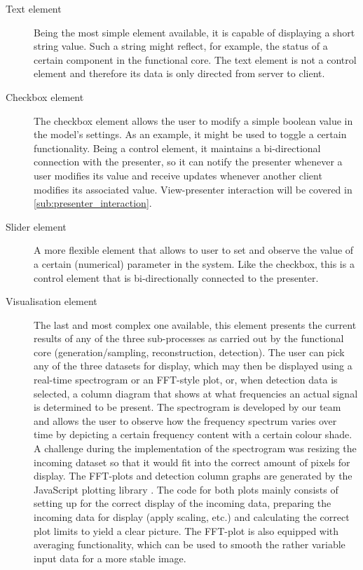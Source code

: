 \documentclass[a4paper, openany, oneside]{memoir}
\begin{document}
\begin{description}
	\item[Text element]
	Being the most simple element available, it is capable of displaying a short string value. Such a string might reflect, for example, the status of a certain component in the functional core. The text element is not a control element and therefore its data is only directed from server to client.

	\item[Checkbox element]
	The checkbox element allows the user to modify a simple boolean value in the model's settings. As an example, it might be used to toggle a certain functionality. Being a control element, it maintains a bi-directional connection with the presenter, so it can notify the presenter whenever a user modifies its value and receive updates whenever another client modifies its associated value. View-presenter interaction will be covered in \cref{sub:presenter_interaction}.

	\item[Slider element]
	A more flexible element that allows to user to set and observe the value of a certain (numerical) parameter in the system. Like the checkbox, this is a control element that is bi-directionally connected to the presenter.

	\item[Visualisation element]
	The last and most complex one available, this element presents the current results of any of the three sub-processes as carried out by the functional core (generation/sampling, reconstruction, detection). The user can pick any of the three datasets for display, which may then be displayed using a real-time spectrogram or an FFT-style plot, or, when detection data is selected, a column diagram that shows at what frequencies an actual signal is determined to be present.
	The spectrogram is developed by our team and allows the user to observe how the frequency spectrum varies over time by depicting a certain frequency content with a certain colour shade. A challenge during the implementation of the spectrogram was resizing the incoming dataset so that it would fit into the correct amount of pixels for display.
	The FFT-plots and detection column graphs are generated by the JavaScript plotting library . The code for both plots mainly consists of setting up  for the correct display of the incoming data, preparing the incoming data for display (apply scaling, etc.) and calculating the correct plot limits to yield a clear picture.
	The FFT-plot is also equipped with averaging functionality, which can be used to smooth the rather variable input data for a more stable image.
\end{description}
\end{document}
